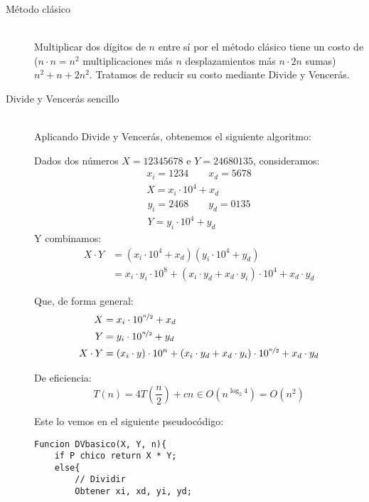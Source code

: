 \begin{description}
    \item [Método clásico]~\\
Multiplicar dos dígitos de $n$ entre sí por el método clásico tiene un costo de ($n\cdot n = n^2$ multiplicaciones más $n$ desplazamientos más $n\cdot 2n$ sumas) $n^2 + n + 2n^2$. Tratamos de reducir su costo mediante Divide y Vencerás.

    \item [Divide y Vencerás sencillo]~\\
    Aplicando Divide y Vencerás, obtenemos el siguiente algoritmo:

    Dados dos números $X = 12345678$ e $Y = 24680135$, consideramos:
    \begin{gather*}
        x_i = 1234 \qquad x_d = 5678 \\
        X = x_i \cdot 10^4 + x_d
    \end{gather*}
    \begin{gather*}
        y_i = 2468 \qquad y_d = 0135 \\
        Y = y_i \cdot 10^4 + y_d
    \end{gather*}
    Y combinamos:
    \begin{align*}
        X \cdot Y &= (x_i \cdot 10^4 + x_d)(y_i \cdot 10^4 + y_d)\\
        &= x_i \cdot y_i \cdot 10^8 + (x_i \cdot y_d + x_d \cdot y_i) \cdot 10^4 + x_d \cdot y_d
    \end{align*}

    Que, de forma general:
    \begin{align*}
        X &= x_i \cdot 10^{\nicefrac{n}{2}} + x_d\\
        Y &= y_i \cdot 10^{\nicefrac{n}{2}} + y_d\\
        X \cdot Y &= (x_i \cdot y)\cdot 10^n + (x_i \cdot y_d + x_d \cdot y_i) \cdot 10^{\nicefrac{n}{2}} + x_d \cdot y_d
    \end{align*}

    De eficiencia:
    \begin{equation*}
        T(n) = 4T\left(\dfrac{n}{2}\right) + cn \in O\left(n^{\log_2 4}\right) = O\left(n^2\right)
    \end{equation*}

    Este lo vemos en el siguiente pseudocódigo:
        \begin{listing}[H]
            \begin{verbatim}
Funcion DVbasico(X, Y, n){
    if P chico return X * Y;
    else{
        // Dividir
        Obtener xi, xd, yi, yd;


\end{verbatim}
\end{listing}
\end{description}
